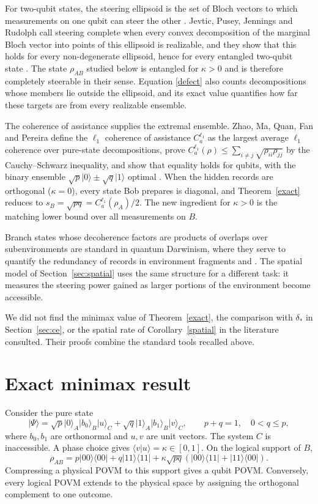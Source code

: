 \documentclass[11pt,a4paper]{article}
\theoremstyle{definition}
\theoremstyle{plain}
\newcommand{\ket}[1]{\lvert#1\rangle}
\newcommand{\bra}[1]{\langle#1\rvert}
\begin{document}
For two-qubit states, the steering ellipsoid is the set of Bloch vectors to
which measurements on one qubit can steer the other \cite{Jevtic}. Jevtic,
Pusey, Jennings and Rudolph call steering complete when every convex
decomposition of the marginal Bloch vector into points of this ellipsoid is
realizable, and they show that this holds for every non-degenerate ellipsoid,
hence for every entangled two-qubit state \cite[Appendix~C]{Jevtic}. The
state $\rho_{AB}$ studied below is entangled for $\kappa>0$ and is therefore
completely steerable in their sense. Equation \eqref{defect} also counts
decompositions whose members lie outside the ellipsoid, and its exact value
quantifies how far these targets are from every realizable ensemble.

The coherence of assistance supplies the extremal ensemble. Zhao, Ma, Quan,
Fan and Pereira define the $\ell_1$ coherence of assistance $C_a^{\ell_1}$ as
the largest average $\ell_1$ coherence over pure-state decompositions, prove
$C_a^{\ell_1}(\rho)\leq\sum_{i\neq j}\sqrt{\rho_{ii}\rho_{jj}}$ by the
Cauchy--Schwarz inequality, and show that equality holds for qubits, with the
binary ensemble $\sqrt p\ket0\pm\sqrt q\ket1$ optimal
\cite[Theorem~1, Corollary~1, Lemma~1]{Zhao}. When the hidden records are
orthogonal ($\kappa=0$), every state Bob prepares is diagonal, and
Theorem~\ref{exact} reduces to $s_B=\sqrt{pq}=C_a^{\ell_1}(\rho_A)/2$. The
new ingredient for $\kappa>0$ is the matching lower bound over all
measurements on $B$.

Branch states whose decoherence factors are products of overlaps over
subenvironments are standard in quantum Darwinism, where they serve to
quantify the redundancy of records in environment fragments
\cite[Secs.~III--IV]{BlumeKohout} and \cite{Zurek}. The spatial model of
Section~\ref{sec:spatial} uses the same structure for a different task: it
measures the steering power gained as larger portions of the environment
become accessible.

We did not find the minimax value of Theorem~\ref{exact}, the comparison
with $\delta_*$ in Section~\ref{sec:ce}, or the spatial rate of
Corollary~\ref{spatial} in the literature consulted. Their proofs combine
the standard tools recalled above.

\section{Exact minimax result}
Consider the pure state
\begin{equation}\label{state}
\ket\Psi=\sqrt p\ket0_A\ket{b_0}_B\ket u_C
+\sqrt q\ket1_A\ket{b_1}_B\ket v_C,
\qquad p+q=1,\quad 0<q\leq p,
\end{equation}
where $b_0,b_1$ are orthonormal and $u,v$ are unit vectors. The system $C$ is
inaccessible. A phase choice gives $\langle v|u\rangle=\kappa\in[0,1]$.
On the logical support of $B$,
\[
\rho_{AB}=p\ket{00}\bra{00}+q\ket{11}\bra{11}
+\kappa\sqrt{pq}(\ket{00}\bra{11}+\ket{11}\bra{00}).
\]
Compressing a physical POVM to this support gives a qubit POVM. Conversely,
every logical POVM extends to the physical space by assigning the orthogonal
complement to one outcome.
\end{document}

